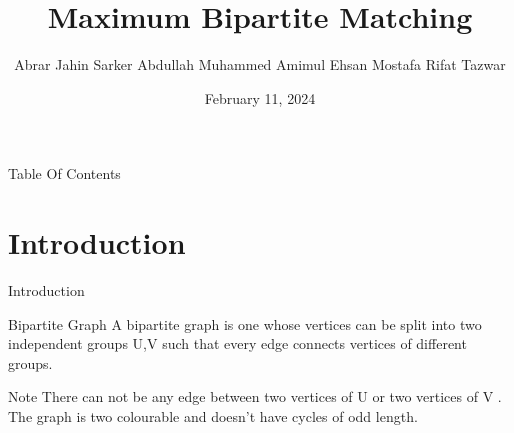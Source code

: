 \documentclass{beamer}
\title{Maximum Bipartite Matching}
\author[Jahin $(2005012)$, Amim $(2005017)$ \& Tazwar $(2005020)$]
{Abrar Jahin Sarker\inst{1} \newline Abdullah  Muhammed  Amimul Ehsan\inst{2} \newline Mostafa Rifat Tazwar\inst{3}}
\institute[VFU] %
{
  \inst{1}$2005012$
  \and
  \inst{2}$2005017$
  \and
  \inst{3}$2005020$
  \and
  \inst{1,2,3}Department of Computer Science and Technology, BUET
}
\date{February 11, 2024}
\begin{document}
\begin{frame}
    \titlepage
\end{frame}

\begin{frame}{Table Of Contents}
    \tableofcontents
\end{frame}


\section{Introduction}
\begin{frame}{Introduction}
    

\begin{block}{Bipartite Graph}
    A bipartite graph is one whose vertices can be split into two independent groups U,V such that every edge connects vertices of different groups.
\end{block}
\begin{alertblock}{Note}
 There can not be any edge between two vertices of U or two vertices of V .\\
     The graph is two colourable and doesn't have cycles of odd length.

\end{alertblock}

    \begin{figure}
        \centering
    \end{figure}

\end{frame}
\end{document}
